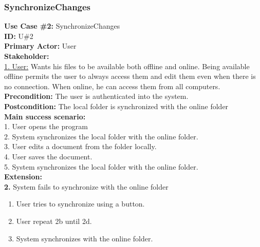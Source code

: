 \subsubsection{SynchronizeChanges}
\textbf{Use Case \#2:} SynchronizeChanges\\
\textbf{ID:} U\#2\\
\textbf{Primary Actor:} User \\
\textbf{Stakeholder:}\\
\underline{1. User:} Wants his files to be available both offline and online. Being available offline permits the user to always access them and edit them even when there is no connection. When online, he can access them from all computers.\\
\newline
\textbf{Precondition:} The user is authenticated into the system.\\
\textbf{Postcondition:} The local folder is synchronized with the online folder\\
\newline
\textbf{Main success scenario:}\\
1. User opens the program\\
2. System synchronizes the local folder with the online folder.\\
3. User edits a document from the folder locally.\\
4. User saves the document.\\
5. System synchronizes the local folder with the online folder.\\
\newline
\textbf{Extension:}\\
\textbf{2.} System fails to synchronize with the online folder
\begin{enumerate}
\item User tries to synchronize using a button.
\item User repeat 2b until 2d.
\item System synchronizes with the online folder.
\end{enumerate}
